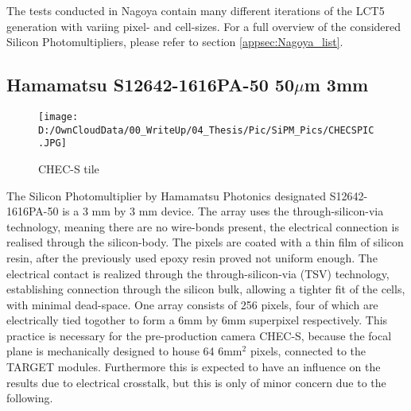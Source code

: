 \documentclass[12pt,article,type=msc,colorback,accentcolor=tud9c]{tudthesis}
\begin{document}
The tests conducted in Nagoya contain many different iterations of the LCT5 generation with variing pixel- and cell-sizes.
For a full overview of the considered Silicon Photomultipliers, please refer to section {\ref{appsec:Nagoya_list}}.



\clearpage
\subsection{Hamamatsu S12642-1616PA-50 50$\mu$m 3mm}
\begin{wrapfigure}{R}{0.3\textwidth}
\centering
\texttt{[image: D:/OwnCloudData/00\_WriteUp/04\_Thesis/Pic/SiPM\_Pics/CHECSPIC.JPG]}
\caption[CHEC-S SiPM]{\label{fig:CHECSTILE}CHEC-S tile}
\end{wrapfigure}
The Silicon Photomultiplier by Hamamatsu Photonics designated S12642-1616PA-50 is a 3 mm by 3 mm device. The array uses the through-silicon-via technology, meaning there are no wire-bonds present, the electrical connection is realised through the silicon-body. The pixels are coated with a thin film of silicon resin, after the previously used epoxy resin proved not uniform enough. The electrical contact is realized through the through-silicon-via (TSV) technology, establishing connection through the silicon bulk, allowing a tighter fit of the cells, with minimal dead-space. One array consists of 256 pixels, four of which are electrically tied togother to form a 6mm by 6mm superpixel respectively. This practice is necessary for the pre-production camera CHEC-S, because the focal plane is mechanically designed to house 64 6mm$^{2}$ pixels, connected to the TARGET modules. Furthermore this is expected to have an influence on the results due to electrical crosstalk, but this is only of minor concern due to the following. 
\end{document}
